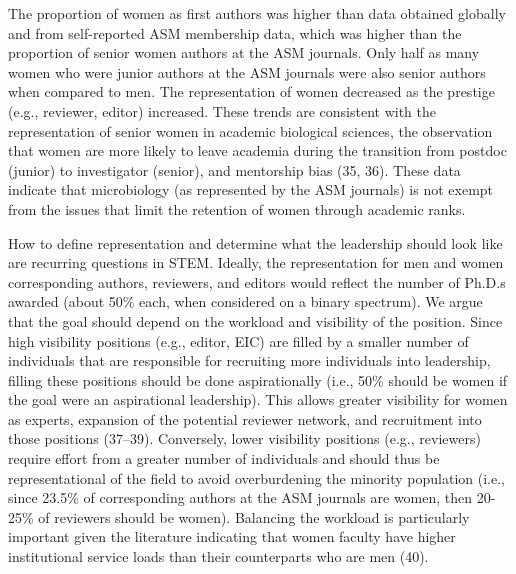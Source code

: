 \documentclass[11pt,]{article}
\begin{document}
The proportion of women as first authors was higher than data obtained
globally and from self-reported ASM membership data, which was higher
than the proportion of senior women authors at the ASM journals. Only
half as many women who were junior authors at the ASM journals were also
senior authors when compared to men. The representation of women
decreased as the prestige (e.g., reviewer, editor) increased. These
trends are consistent with the representation of senior women in
academic biological sciences, the observation that women are more likely
to leave academia during the transition from postdoc (junior) to
investigator (senior), and mentorship bias (35, 36). These data indicate
that microbiology (as represented by the ASM journals) is not exempt
from the issues that limit the retention of women through academic
ranks.

How to define representation and determine what the leadership should
look like are recurring questions in STEM. Ideally, the representation
for men and women corresponding authors, reviewers, and editors would
reflect the number of Ph.D.s awarded (about 50\% each, when considered
on a binary spectrum). We argue that the goal should depend on the
workload and visibility of the position. Since high visibility positions
(e.g., editor, EIC) are filled by a smaller number of individuals that
are responsible for recruiting more individuals into leadership, filling
these positions should be done aspirationally (i.e., 50\% should be
women if the goal were an aspirational leadership). This allows greater
visibility for women as experts, expansion of the potential reviewer
network, and recruitment into those positions (37--39). Conversely,
lower visibility positions (e.g., reviewers) require effort from a
greater number of individuals and should thus be representational of the
field to avoid overburdening the minority population (i.e., since 23.5\%
of corresponding authors at the ASM journals are women, then 20-25\% of
reviewers should be women). Balancing the workload is particularly
important given the literature indicating that women faculty have higher
institutional service loads than their counterparts who are men (40).
\end{document}
